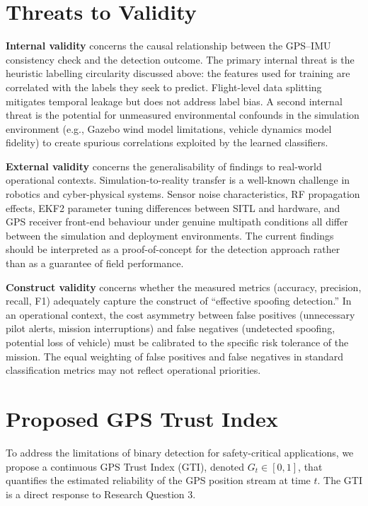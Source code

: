 \section{Threats to Validity}

\textbf{Internal validity} concerns the causal relationship between the GPS--IMU consistency check and the detection outcome. The primary internal threat is the heuristic labelling circularity discussed above: the features used for training are correlated with the labels they seek to predict. Flight-level data splitting mitigates temporal leakage but does not address label bias. A second internal threat is the potential for unmeasured environmental confounds in the simulation environment (e.g., Gazebo wind model limitations, vehicle dynamics model fidelity) to create spurious correlations exploited by the learned classifiers.

\textbf{External validity} concerns the generalisability of findings to real-world operational contexts. Simulation-to-reality transfer is a well-known challenge in robotics and cyber-physical systems. Sensor noise characteristics, RF propagation effects, EKF2 parameter tuning differences between SITL and hardware, and GPS receiver front-end behaviour under genuine multipath conditions all differ between the simulation and deployment environments. The current findings should be interpreted as a proof-of-concept for the detection approach rather than as a guarantee of field performance.

\textbf{Construct validity} concerns whether the measured metrics (accuracy, precision, recall, F1) adequately capture the construct of ``effective spoofing detection.'' In an operational context, the cost asymmetry between false positives (unnecessary pilot alerts, mission interruptions) and false negatives (undetected spoofing, potential loss of vehicle) must be calibrated to the specific risk tolerance of the mission. The equal weighting of false positives and false negatives in standard classification metrics may not reflect operational priorities.

\section{Proposed GPS Trust Index}

To address the limitations of binary detection for safety-critical applications, we propose a continuous GPS Trust Index (GTI), denoted \(G_t \in [0, 1]\), that quantifies the estimated reliability of the GPS position stream at time \(t\). The GTI is a direct response to Research Question 3.

